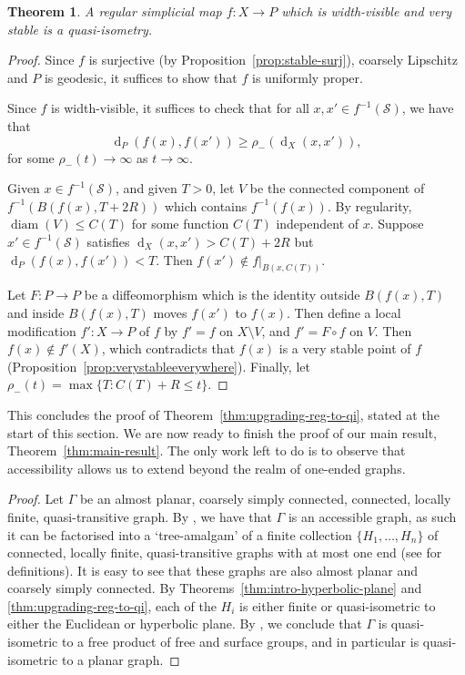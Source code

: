 \documentclass[11pt,a4paper]{amsart}
\DeclareMathOperator{\diam}{diam}
\DeclareMathOperator{\dist}{d}
\newtheorem{theorem}{Theorem}[section]%
\theoremstyle{definition}
\begin{document}
\begin{theorem}
    A regular simplicial map $f:X \to P$ which is width-visible and very stable is a quasi-isometry.
\end{theorem}
\begin{proof}
    Since $f$ is surjective (by Proposition~\ref{prop:stable-surj}), coarsely Lipschitz and $P$ is geodesic, it suffices to show that $f$ is uniformly proper.

    Since $f$ is width-visible, it suffices to check that for all $x,x' \in f^{-1}(\mathscr{S})$, we have that 
    $$
    \dist_P(f(x),f(x')) \geq \rho_-(\dist_X(x,x')),
    $$
    for some $\rho_-(t)\to \infty$ as $t \to \infty$.

    Given $x \in f^{-1}(\mathscr{S})$, and given $T > 0$,
    let $V$ be the connected component of $f^{-1}(B(f(x),T+2R))$ which contains $f^{-1}(f(x))$.
    By regularity, $\diam(V) \leq C(T)$ for some function $C(T)$ independent of $x$.
    Suppose $x' \in f^{-1}(\mathscr{S})$ satisfies $\dist_X(x,x') > C(T)+2R$ but $\dist_P(f(x),f(x')) < T$.  Then $f(x') \notin f|_{B(x,C(T))}$.
    
    Let $F:P \to P$ be a diffeomorphism which is the identity outside $B(f(x),T)$ and inside $B(f(x),T)$ moves $f(x')$ to $f(x)$.
    Then define a local modification $f':X \to P$ of $f$ by $f' = f$ on $X \setminus V$, and $f' = F \circ f$ on $V$.
    Then $f(x) \notin f'(X)$, which contradicts that $f(x)$ is a very stable point of $f$ (Proposition~\ref{prop:verystableeverywhere}).
    Finally, let $\rho_-(t) = \max\{T:C(T)+R \leq t\}$.
\end{proof}


This concludes the proof of Theorem~\ref{thm:upgrading-reg-to-qi}, stated at the start of this section.
We are now ready to finish the proof of our main result, Theorem~\ref{thm:main-result}. The only work left to do is to observe that accessibility allows us to extend beyond the realm of one-ended graphs.

\mainresult*

\begin{proof}
    Let $\Gamma$ be an almost planar, coarsely simply connected, connected, locally finite, quasi-transitive graph. By \cite{hamann2018accessibility}, we have that $\Gamma$ is an accessible graph, as such it can be factorised into a `tree-amalgam' of a  finite collection $\{H_1, \ldots, H_n\}$ of connected, locally finite, quasi-transitive graphs with at most one end (see \cite{hamann2025tree} for definitions).  It is easy to see that these graphs are also almost planar and coarsely simply connected. By Theorems~\ref{thm:intro-hyperbolic-plane} and \ref{thm:upgrading-reg-to-qi}, each of the $H_i$ is either finite or quasi-isometric to either the Euclidean or hyperbolic plane. By \cite{hamann2025tree}, we conclude that $\Gamma$ is quasi-isometric to a free product of free and surface groups, and in particular is quasi-isometric to a planar graph. 
\end{proof}
\end{document}
